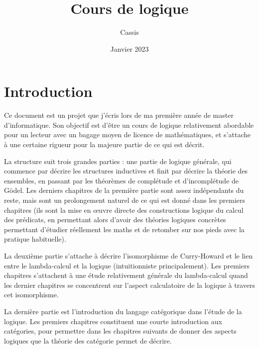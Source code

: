 \documentclass[11pt,french]{book}
\title{Cours de logique}
\author{Cassis}
\date{Janvier 2023}
\begin{document}
\maketitle

\thispagestyle{empty}


\tableofcontents
\thispagestyle{empty}
\vspace{5cm}

\thispagestyle{empty}
\newpage \setcounter{page}{1}

\chapter*{Introduction}

Ce document est un projet que j'écris lors de ma première année de master d'informatique. Son objectif est d'être un cours de logique relativement abordable pour un lecteur avec un bagage moyen de licence de mathématiques, et s'attache à une certaine rigueur pour la majeure partie de ce qui est décrit. 

La structure suit trois grandes parties : une partie de logique générale, qui commence par décrire les structures inductives et finit par décrire la théorie des ensembles, en passant par les théorèmes de complétude et d'incomplétude de Gödel. Les derniers chapitres de la première partie sont assez indépendants du reste, mais sont un prolongement naturel de ce qui est donné dans les premiers chapitres (ils sont la mise en \oe uvre directe des constructions logique du calcul des prédicats, en permettant alors d'avoir des théories logiques concrètes permettant d'étudier réellement les maths et de retomber sur nos pieds avec la pratique habituelle). 

La deuxième partie s'attache à décrire l'isomorphisme de Curry-Howard et le lien entre le lambda-calcul et la logique (intuitionniste principalement). Les premiers chapitres s'attachent à une étude relativement générale du lambda-calcul quand les dernier chapitres se concentrent sur l'aspect calculatoire de la logique à travers cet isomorphisme.

La dernière partie est l'introduction du langage catégorique dans l'étude de la logique. Les premiers chapitres constituent une courte introduction aux catégories, pour permettre dans les chapitres suivants de donner des aspects logiques que la théorie des catégorie permet de décrire.
\end{document}
